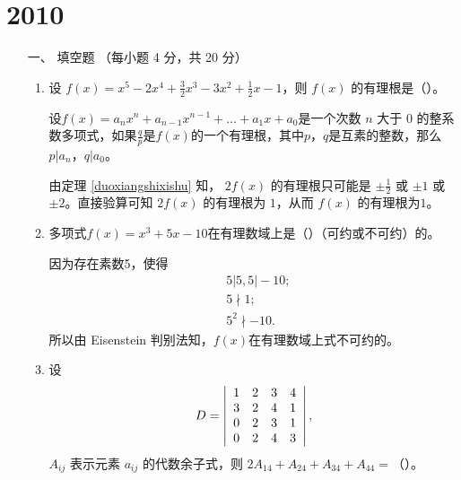 \section{2010}
\begin{enumerate}[1~]
\renewcommand{\labelenumi}{\textbf{\theenumi. }}
\renewcommand{\Im}{\text{Im }}
\item[一、]
填空题 （每小题 4 分，共 20 分）
\begin{enumerate}[1.~]
\item
设 $f ( x ) = x ^ { 5 } - 2 x ^ { 4 } + \frac { 3 } { 2 } x ^ { 3 } - 3 x ^ { 2 } + \frac { 1 } { 2 } x - 1$，则 $f(x)$ 的有理根是（\quad）。

\begin{solution}
\begin{theorem}\label{duoxiangshixishu}
设$f ( x ) = a _ { n } x ^ { n } + a _ { n - 1 } x ^ { n - 1 } + \dots + a _ { 1 } x + a _ { 0 }$是一个次数 $n$ 大于 $0$ 的整系数多项式，如果$\frac{q}{p}$是$f(x)$的一个有理根，其中$p$，$q$是互素的整数，那么$p|a_n$，$q|a_0$。
\end{theorem}

由定理 \eqref{duoxiangshixishu} 知， $2f(x)$ 的有理根只可能是 $\pm\frac12$ 或 $\pm1$ 或 $\pm2$。直接验算可知 $2f(x)$ 的有理根为 $1$，从而 $f(x)$ 的有理根为$1$。
 \end{solution}
 
\item
多项式$ f(x) = x^3 + 5x − 10 $在有理数域上是（\quad）（可约或不可约）的。

\begin{solution}
因为存在素数5，使得\begin{align*}
&5|5, 5|-10;\\
&5\nmid 1;\\
&5^2\nmid -10.
\end{align*}
所以由 Eisenstein 判别法知，$f(x)$在有理数域上式不可约的。
\end{solution}

\item
设
$$
D = \left| \begin{array} { c c c c } { 1 } & { 2 } & { 3 } & { 4 } \\ { 3 } & { 2 } & { 4 } & { 1 } \\ { 0 } & { 2 } & { 3 } & { 1 } \\ { 0 } & { 2 } & { 4 } & { 3 } \end{array} \right|,
$$
$A_{ij}$ 表示元素 $a_{ij}$ 的代数余子式，则 $2A_{14} + A_{24} + A_{34} + A_{44} = $（\quad）。


\end{enumerate}
\end{enumerate}
